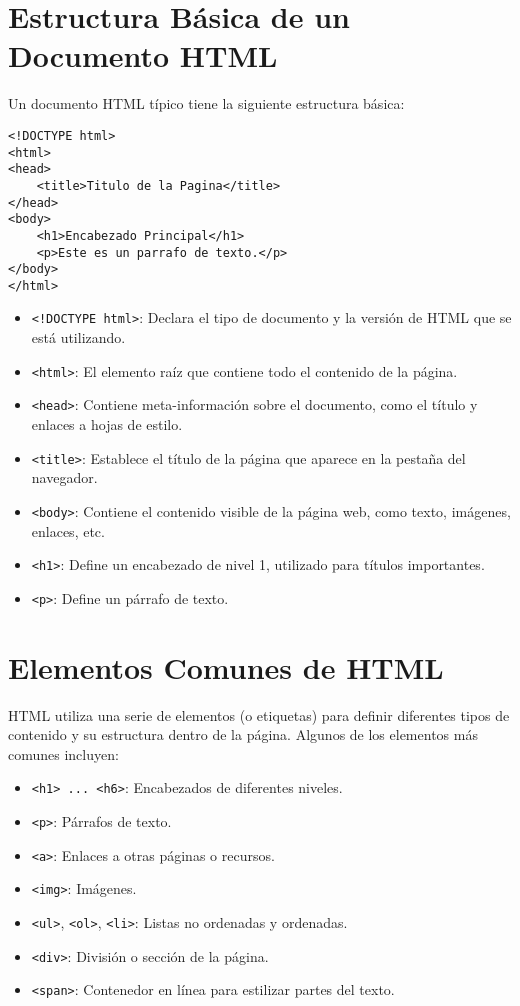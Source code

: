 \documentclass{book}
\begin{document}
\section{Estructura Básica de un Documento HTML}
Un documento HTML típico tiene la siguiente estructura básica:

\begin{lstlisting}[language=HTML5]
<!DOCTYPE html>
<html>
<head>
    <title>Titulo de la Pagina</title>
</head>
<body>
    <h1>Encabezado Principal</h1>
    <p>Este es un parrafo de texto.</p>
</body>
</html>
\end{lstlisting}

\begin{itemize}
    \item \texttt{<!DOCTYPE html>}: Declara el tipo de documento y la versión de HTML que se está utilizando.
    \item \texttt{<html>}: El elemento raíz que contiene todo el contenido de la página.
    \item \texttt{<head>}: Contiene meta-información sobre el documento, como el título y enlaces a hojas de estilo.
    \item \texttt{<title>}: Establece el título de la página que aparece en la pestaña del navegador.
    \item \texttt{<body>}: Contiene el contenido visible de la página web, como texto, imágenes, enlaces, etc.
    \item \texttt{<h1>}: Define un encabezado de nivel 1, utilizado para títulos importantes.
    \item \texttt{<p>}: Define un párrafo de texto.
\end{itemize}

\section{Elementos Comunes de HTML}
HTML utiliza una serie de elementos (o etiquetas) para definir diferentes tipos de contenido y su estructura dentro de la página. Algunos de los elementos más comunes incluyen:

\begin{itemize}
    \item \texttt{<h1> ... <h6>}: Encabezados de diferentes niveles.
    \item \texttt{<p>}: Párrafos de texto.
    \item \texttt{<a>}: Enlaces a otras páginas o recursos.
    \item \texttt{<img>}: Imágenes.
    \item \texttt{<ul>}, \texttt{<ol>}, \texttt{<li>}: Listas no ordenadas y ordenadas.
    \item \texttt{<div>}: División o sección de la página.
    \item \texttt{<span>}: Contenedor en línea para estilizar partes del texto.
\end{itemize}
\end{document}
